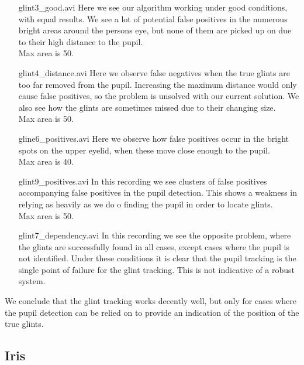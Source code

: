 \begin{itemize}
	\item[glint3\_good.avi] Here we see our algorithm working under good conditions, with equal results. We see a lot of potential false positives in the numerous bright areas around the persons eye, but none of them are picked up on due to their high distance to the pupil.\\Max area is 50.
	\item[glint4\_distance.avi] Here we observe false negatives when the true glints are too far removed from the pupil. Increasing the maximum distance would only cause false positives, so the problem is unsolved with our current solution. We also see how the glints are sometimes missed due to their changing size.\\Max area is 50.
	\item[gline6\_positives.avi] Here we observe how false positives occur in the bright spots on the upper eyelid, when these move close enough to the pupil.\\Max area is 40.
	\item[glint9\_positives.avi] In this recording we see clusters of false positives accompanying false positives in the pupil detection. This shows a weakness in relying as heavily as we do o finding the pupil in order to locate glints.\\Max area is 50.
	\item[glint7\_dependency.avi] In this recording we see the opposite problem, where the glints are successfully found in all cases, except cases where the pupil is not identified. Under these conditions it is clear that the pupil tracking is the single point of failure for the glint tracking. This is not indicative of a robust system.
\end{itemize}
We conclude that the glint tracking works decently well, but only for cases where the pupil detection can be relied on to provide an indication of the position of the true glints.

\subsection{Iris}

